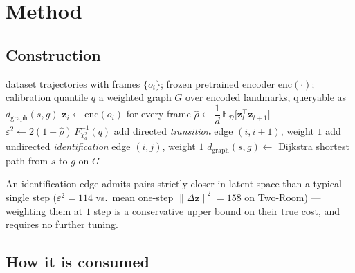 \documentclass[11pt]{article}
\newcommand{\dgraph}{d_{\mathrm{graph}}}
\newcommand{\zv}{\mathbf{z}}
\begin{document}
\section{Method}
\label{sec:method}

\subsection{Construction}

\begin{algorithm}[H]
\caption{Latent graph construction}
\label{alg:construction}
\begin{algorithmic}[1]
\Require dataset trajectories with frames $\{o_i\}$; frozen pretrained encoder $\mathrm{enc}(\cdot)$; calibration quantile $q$
\Ensure a weighted graph $G$ over encoded landmarks, queryable as $\dgraph(s,g)$
\State $\zv_i \gets \mathrm{enc}(o_i)$ for every frame 
\State $\hat\rho \gets \dfrac{1}{d}\,\mathbb{E}_{\mathcal D}\bigl[\zv_t^\top \zv_{t+1}\bigr]$ 
\State $\varepsilon^2 \gets 2(1-\hat\rho)\,F^{-1}_{\chi^2_d}(q)$ 
        \State add directed \emph{transition} edge $(i,i{+}1)$, weight $1$ 
    \EndFor
\EndFor
{}
    \If{$\|\zv_i - \zv_j\|^2 < \varepsilon^2$}
        \State add undirected \emph{identification} edge $(i,j)$, weight $1$ 
    \EndIf
\EndFor
\Return $\dgraph(s,g) \gets$ Dijkstra shortest path from $s$ to $g$ on $G$ 
\end{algorithmic}
\end{algorithm}

An identification edge admits pairs strictly closer in latent space than a typical single step
($\varepsilon^2 = 114$ vs.\ mean one-step $\|\Delta \zv\|^2 = 158$ on Two-Room) --- weighting them
at $1$ step is a conservative upper bound on their true cost, and requires no further tuning.

\subsection{How it is consumed}
\end{document}
